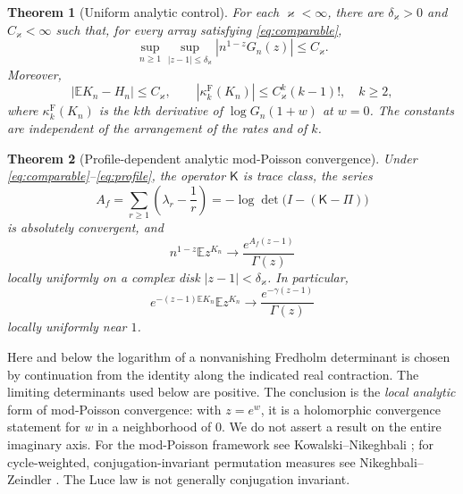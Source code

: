 \documentclass[11pt]{article}
\numberwithin{equation}{section}
\newtheorem{theorem}{Theorem}[section]
\theoremstyle{definition}
\theoremstyle{remark}
\newcommand{\E}{\mathbb E}
\newcommand{\Kop}{\mathsf K}
\newcommand{\abs}[1]{\left|#1\right|}
\begin{document}
\begin{theorem}[Uniform analytic control]\label{thm:uniform}
For each $\varkappa<\infty$, there are $\delta_\varkappa>0$ and $C_\varkappa<\infty$ such that, for every array satisfying \eqref{eq:comparable},
\begin{equation}\label{eq:normal-bound}
 \sup_{n\ge1}\sup_{|z-1|\le\delta_\varkappa}
 \abs{n^{1-z}G_n(z)}\le C_\varkappa.
\end{equation}
Moreover,
\begin{equation}\label{eq:uniform-cumulants}
 |\E K_n-H_n|\le C_\varkappa,
 \qquad
 |\kappa_k^{\mathrm F}(K_n)|\le C_\varkappa^k(k-1)!,\quad k\ge2,
\end{equation}
where $\kappa_k^{\mathrm F}(K_n)$ is the $k$th derivative of $\log G_n(1+w)$ at $w=0$. The constants are independent of the arrangement of the rates and of $k$.
\end{theorem}

\begin{theorem}[Profile-dependent analytic mod-Poisson convergence]\label{thm:profile}
Under \eqref{eq:comparable}--\eqref{eq:profile}, the operator $\Kop$ is trace class, the series
\begin{equation}\label{eq:Af}
 A_f=\sum_{r\ge1}\left(\lambda_r-\frac1r\right)
     =-\log\det\bigl(I-(\Kop-\Pi)\bigr)
\end{equation}
is absolutely convergent, and
\begin{equation}\label{eq:mod-poisson}
 n^{1-z}\E z^{K_n}\longrightarrow
 \frac{e^{A_f(z-1)}}{\Gamma(z)}
\end{equation}
locally uniformly on a complex disk $|z-1|<\delta_\varkappa$. In particular,
\begin{equation}\label{eq:exact-mean-residue}
 e^{-(z-1)\E K_n}\E z^{K_n}
 \longrightarrow \frac{e^{-\gamma(z-1)}}{\Gamma(z)}
\end{equation}
locally uniformly near $1$.
\end{theorem}

Here and below the logarithm of a nonvanishing Fredholm determinant is chosen by continuation from the identity along the indicated real contraction. The limiting determinants used below are positive. The conclusion is the \emph{local analytic} form of mod-Poisson convergence: with $z=e^w$, it is a holomorphic convergence statement for $w$ in a neighborhood of $0$. We do not assert a result on the entire imaginary axis. For the mod-Poisson framework see Kowalski--Nikeghbali \cite{KN}; for cycle-weighted, conjugation-invariant permutation measures see Nikeghbali--Zeindler \cite{NZ}. The Luce law is not generally conjugation invariant.
\end{document}
